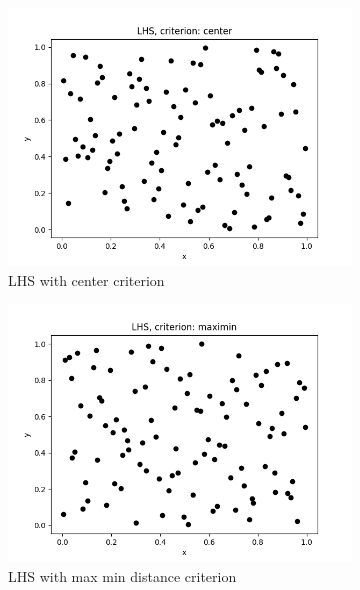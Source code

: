 \begin{figure}[h!]
    \centering
    \begin{subfigure}[b]{0.49\textwidth}
        \includegraphics[width=\textwidth]{resources/images/sampling-lhs-center.png}
        \caption{LHS with center criterion}
        \label{fig:sampling-lhs-center}
    \end{subfigure} 
    \hfill
    \begin{subfigure}[b]{0.49\textwidth}
        \includegraphics[width=\textwidth]{resources/images/sampling-lhs-maximin.png}
        \caption{LHS with max min distance criterion}
        \label{fig:sampling-lhs-maximin}
    \end{subfigure} 
    \hfill
    \begin{subfigure}[b]{0.49\textwidth}

\end{subfigure}
\end{figure}
